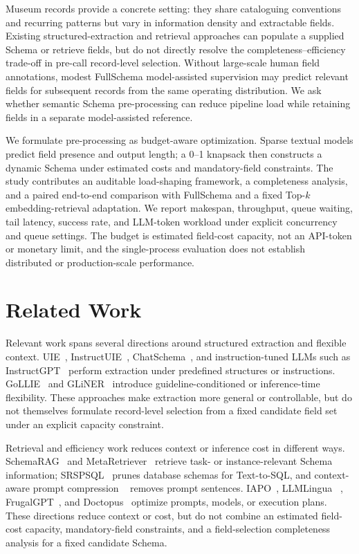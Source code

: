 \documentclass[runningheads]{llncs}
\newcommand{\full}{FullSchema}
\begin{document}
 Museum records provide a concrete setting: they share cataloguing conventions and recurring patterns but vary in information density and extractable fields. Existing structured-extraction and retrieval approaches can populate a supplied Schema or retrieve fields, but do not directly resolve the completeness--efficiency trade-off in pre-call record-level selection. Without large-scale human field annotations, modest \full{} model-assisted supervision may predict relevant fields for subsequent records from the same operating distribution. We ask whether semantic Schema pre-processing can reduce pipeline load while retaining fields in a separate model-assisted reference.

 We formulate pre-processing as budget-aware optimization. Sparse textual models predict field presence and output length; a 0--1 knapsack then constructs a dynamic Schema under estimated costs and mandatory-field constraints. The study contributes an auditable load-shaping framework, a completeness analysis, and a paired end-to-end comparison with \full{} and a fixed Top-$k$ embedding-retrieval adaptation. We report makespan, throughput, queue waiting, tail latency, success rate, and LLM-token workload under explicit concurrency and queue settings. The budget is estimated field-cost capacity, not an API-token or monetary limit, and the single-process evaluation does not establish distributed or production-scale performance.

\section{Related Work}

Relevant work spans several directions around structured extraction and flexible
context. UIE~\cite{uie}, InstructUIE~\cite{instructuie}, ChatSchema~\cite{chatschema},
and instruction-tuned LLMs such as InstructGPT~\cite{instructgpt} perform
extraction under predefined structures or instructions. GoLLIE~\cite{gollie} and
GLiNER~\cite{gliner} introduce guideline-conditioned or inference-time
flexibility. These approaches make extraction more general or controllable, but
do not themselves formulate record-level selection from a fixed candidate field
set under an explicit capacity constraint.

Retrieval and efficiency work reduces context or inference cost in different
ways. SchemaRAG~\cite{schemarag} and MetaRetriever~\cite{metaretriever} retrieve
task- or instance-relevant Schema information; SRSPSQL~\cite{srspsql} prunes
database schemas for Text-to-SQL, and context-aware prompt compression
~\cite{cpc} removes prompt sentences. IAPO~\cite{iapo}, LLMLingua
~\cite{llmlingua}, FrugalGPT~\cite{frugalgpt}, and Doctopus~\cite{doctopus}
optimize prompts, models, or execution plans. These directions reduce context or
cost, but do not combine an estimated field-cost capacity, mandatory-field
constraints, and a field-selection completeness analysis for a fixed candidate
Schema.
\end{document}
